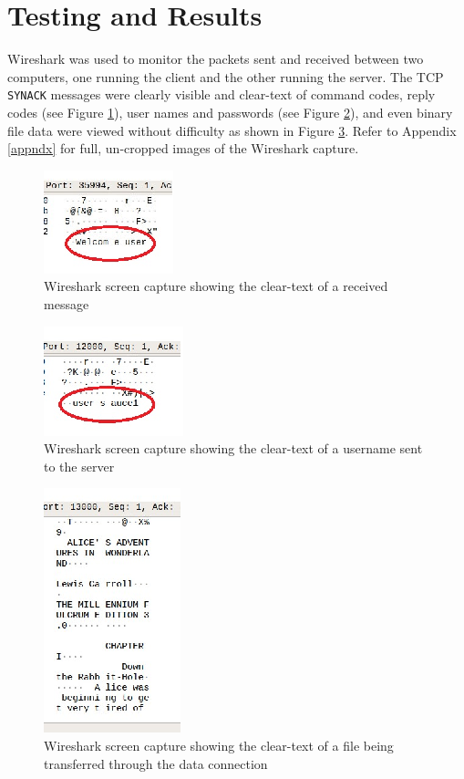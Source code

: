 \documentclass[journal, a4paper]{IEEEtran}
\begin{document}
\section{Testing and Results}
Wireshark was used to monitor the packets sent and received between two computers, one running the client and the other running the server. The TCP \texttt{SYNACK} messages were clearly visible and clear-text of command codes, reply codes (see Figure \ref{wirecodes}), user names and passwords (see Figure \ref{wirenames}), and even binary file data were viewed without difficulty as shown in Figure \ref{wiredata}. Refer to Appendix \ref{appndx} for full, un-cropped images of the Wireshark capture.
\begin{figure}[hbtp!]
	\centering
	\includegraphics[scale = 3.0]{wirecodes}
	\caption{Wireshark screen capture showing the clear-text of a received message}
	\label{wirecodes}
\end{figure}
\begin{figure}[hbtp!]
	\centering
	\includegraphics[scale = 3.0]{wirenames}
	\caption{Wireshark screen capture showing the clear-text of a username sent to the server}
	\label{wirenames}
\end{figure}
\begin{figure}[hbtp!]
	\centering
	\includegraphics[scale = 2.0]{wiredata}
	\caption{Wireshark screen capture showing the clear-text of a file being transferred through the data connection}
	\label{wiredata}
\end{figure}
\end{document}
